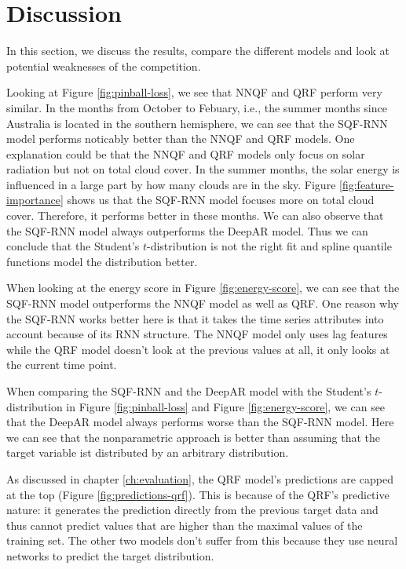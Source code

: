 \section{Discussion}
\label{sec:discussion}

In this section, we discuss the results, compare the different 
models and look at potential weaknesses of the competition. 

Looking at Figure \ref{fig:pinball-loss}, we see that NNQF and QRF perform very similar. 
In the months from October to Febuary, i.e., the summer months since 
Australia is located in the southern hemisphere, we can see that 
the SQF-RNN model performs noticably better than the NNQF and QRF models. 
One explanation could be that the NNQF and QRF models only focus on solar 
radiation but not on total cloud cover.  
In the summer months, the solar energy is influenced in a large part by 
how many clouds are in the sky. Figure \ref{fig:feature-importance} shows us that 
the SQF-RNN model focuses more on total cloud cover. Therefore, 
it performs better in these months. 
We can also observe that the SQF-RNN model always outperforms the DeepAR model. 
Thus we can conclude that the Student's \(t\)-distribution is not the right fit 
and spline quantile functions model the distribution better. 

When looking at the energy score in Figure \ref{fig:energy-score}, 
we can see that the SQF-RNN model outperforms the NNQF model as well as QRF.
One reason why the SQF-RNN works better here is that it takes 
the time series attributes into account because of its RNN structure. 
The NNQF model only uses lag features while the QRF model doesn't look 
at the previous values at all, it only looks at the current time point.

When comparing the SQF-RNN and the DeepAR model with 
the Student's \(t\)-distribution in Figure \ref{fig:pinball-loss} and 
Figure \ref{fig:energy-score}, we can see that the DeepAR model 
always performs worse than the SQF-RNN model. 
Here we can see that the nonparametric approach is better than assuming 
that the target variable ist distributed by an arbitrary distribution. 

As discussed in chapter \ref{ch:evaluation}, 
the QRF model's predictions are capped 
at the top (Figure \ref{fig:predictions-qrf}). 
This is because of the QRF's predictive nature: it generates 
the prediction directly from the previous target data 
and thus cannot predict values 
that are higher than the maximal values of the training set. 
The other two models don't suffer from this because they use 
neural networks to predict the target distribution.

